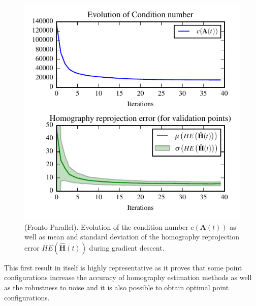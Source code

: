 \documentclass[letterpaper, 10 pt, conference]{ieeeconf}  %
\begin{document}
	\begin{figure}[t]
		\begin{center}
			\includegraphics[width=\columnwidth]{img/homography_fronto_parallel.pdf}
			\caption{\label{fig:FP_cond_homo_error}\small(Fronto-Parallel). Evolution of the condition number $c(\mathbf{A}(t))$ as well as mean and standard deviation of the homography reprojection error $HE\left(\hat{\mathbf{H}}(t)\right)$ during gradient descent.}
		\end{center}
		\vspace{-0.0cm}
	\end{figure}
	
	This first result in itself is highly representative as it proves that some point configurations increase the accuracy of homography estimation methods as well as the robustness to noise and it is also possible to obtain optimal point configurations. 
	
	
	
\end{document}
